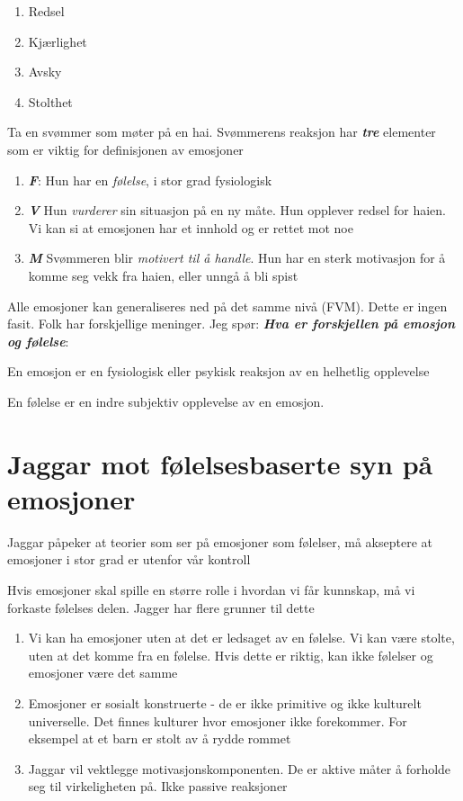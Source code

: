 \documentclass[11pt, a4paper]{article}
\begin{document}
\begin{enumerate}
    \item Redsel
    \item Kjærlighet
    \item Avsky
    \item Stolthet
\end{enumerate}


Ta en svømmer som møter på en hai. Svømmerens reaksjon har \textbf{\textit{tre}} elementer som er viktig for definisjonen av emosjoner

\begin{enumerate}
    \item \textbf{\textit{F}}: Hun har en \textit{følelse}, i stor grad fysiologisk
    \item \textbf{\textit{V}} Hun \textit{vurderer} sin situasjon på en ny måte. Hun opplever redsel for haien. Vi kan si at emosjonen har et innhold og er rettet mot noe
    \item \textbf{\textit{M}} Svømmeren blir \textit{motivert til å handle}. Hun har en sterk motivasjon for å komme seg vekk fra haien, eller unngå å bli spist
\end{enumerate}

Alle emosjoner kan generaliseres ned på det samme nivå (FVM). Dette er ingen fasit. Folk har forskjellige meninger.
\vspace{1em}
Jeg spør: \textbf{\textit{Hva er forskjellen på emosjon og følelse}}:

En emosjon er en fysiologisk eller psykisk reaksjon av en helhetlig opplevelse

En følelse er en indre subjektiv opplevelse av en emosjon.


\section{Jaggar mot følelsesbaserte syn på emosjoner}

Jaggar påpeker at teorier som ser på emosjoner som følelser, må akseptere at emosjoner i stor grad er utenfor vår kontroll

Hvis emosjoner skal spille en større rolle i hvordan vi får kunnskap, må vi forkaste følelses delen. Jagger har flere grunner til dette

\begin{enumerate}
    \item Vi kan ha emosjoner uten at det er ledsaget av en følelse. Vi kan være stolte, uten at det komme fra en følelse. Hvis dette er riktig, kan ikke følelser og emosjoner være det samme
    \item Emosjoner er sosialt konstruerte - de er ikke primitive og ikke kulturelt universelle. Det finnes kulturer hvor emosjoner ikke forekommer. For eksempel at et barn er stolt av å rydde rommet
    \item Jaggar vil vektlegge motivasjonskomponenten. De er aktive måter å forholde seg til virkeligheten på. Ikke passive reaksjoner
\end{enumerate}
\end{document}

